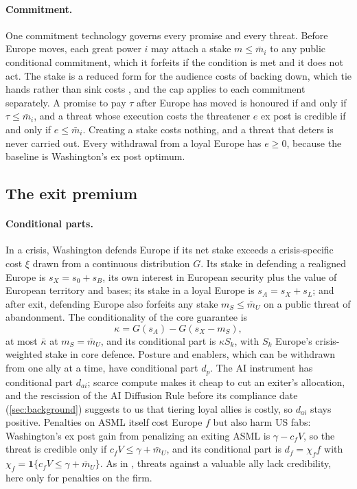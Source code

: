 \paragraph{Commitment.}\label{sec:commitment} One commitment technology governs every promise and every threat. Before Europe moves, each great power $i$ may attach a stake $m\le\bar m_i$ to any public conditional commitment, which it forfeits if the condition is met and it does not act. The stake is a reduced form for the audience costs of backing down, which tie hands rather than sink costs \citep{fearon1994domestic, fearon1997signaling}, and the cap applies to each commitment separately. A promise to pay $\tau$ after Europe has moved is honoured if and only if $\tau\le\bar m_i$, and a threat whose execution costs the threatener $e$ ex post is credible if and only if $e\le\bar m_i$. Creating a stake costs nothing, and a threat that deters is never carried out. Every withdrawal from a loyal Europe has $e\ge 0$, because the baseline is Washington's ex post optimum.

\subsection{The exit premium}\label{sec:security}

\paragraph{Conditional parts.} In a crisis, Washington defends Europe if its net stake exceeds a crisis-specific cost $\xi$ drawn from a continuous distribution $G$. Its stake in defending a realigned Europe is $s_X=s_0+s_B$, its own interest in European security plus the value of European territory and bases; its stake in a loyal Europe is $s_A=s_X+s_L$; and after exit, defending Europe also forfeits any stake $m_S\le\bar m_U$ on a public threat of abandonment. The conditionality of the core guarantee is
\begin{equation}\label{eq:kappa}
\kappa=G(s_A)-G(s_X-m_S),
\end{equation}
at most $\bar\kappa$ at $m_S=\bar m_U$, and its conditional part is $\kappa S_k$, with $S_k$ Europe's crisis-weighted stake in core defence. Posture and enablers, which can be withdrawn from one ally at a time, have conditional part $d_p$. The AI instrument has conditional part $d_{ai}$; scarce compute makes it cheap to cut an exiter's allocation, and the rescission of the AI Diffusion Rule before its compliance date (\cref{sec:background}) suggests to us that tiering loyal allies is costly, so $d_{ai}$ stays positive. Penalties on ASML itself cost Europe $f$ but also harm US fabs: Washington's ex post gain from penalizing an exiting ASML is $\gamma-c_fV$, so the threat is credible only if $c_fV\le\gamma+\bar m_U$, and its conditional part is $d_f=\chi_ff$ with $\chi_f=\mathbf 1\{c_fV\le\gamma+\bar m_U\}$. As in \citet{wolford2017alliances}, threats against a valuable ally lack credibility, here only for penalties on the firm.

